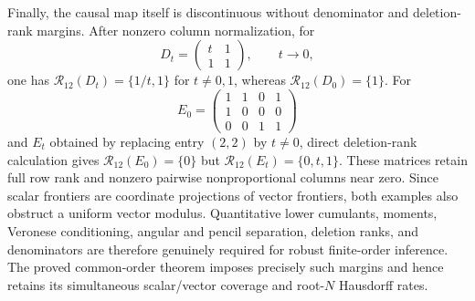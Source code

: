 Finally, the causal map itself is discontinuous without denominator and deletion-rank margins. After nonzero column normalization, for
\[
 D_t=\begin{pmatrix}t&1\\1&1\end{pmatrix},\qquad t\to0,
\]
one has \(\mathcal R_{12}(D_t)=\{1/t,1\}\) for \(t\ne0,1\), whereas \(\mathcal R_{12}(D_0)=\{1\}\). For
\[
 E_0=\begin{pmatrix}1&1&0&1\\1&0&0&0\\0&0&1&1\end{pmatrix}
\]
and \(E_t\) obtained by replacing entry \((2,2)\) by \(t\ne0\), direct deletion-rank calculation gives \(\mathcal R_{12}(E_0)=\{0\}\) but \(\mathcal R_{12}(E_t)=\{0,t,1\}\). These matrices retain full row rank and nonzero pairwise nonproportional columns near zero. Since scalar frontiers are coordinate projections of vector frontiers, both examples also obstruct a uniform vector modulus. Quantitative lower cumulants, moments, Veronese conditioning, angular and pencil separation, deletion ranks, and denominators are therefore genuinely required for robust finite-order inference. The proved common-order theorem imposes precisely such margins and hence retains its simultaneous scalar/vector coverage and root-\(N\) Hausdorff rates.